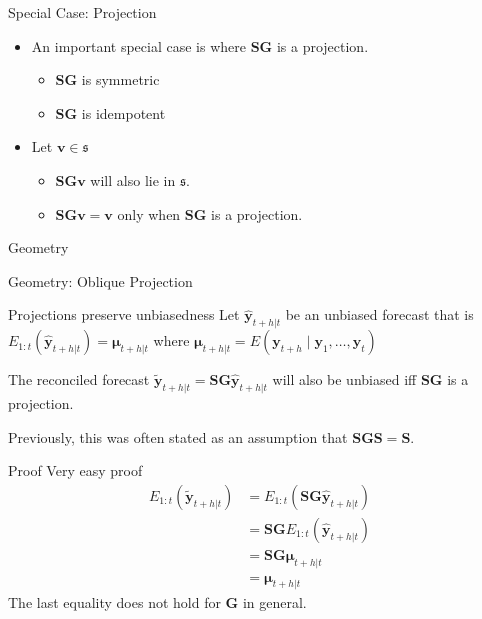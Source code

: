 \documentclass{beamer}
\begin{document}
  \begin{frame}{Special Case: Projection}
  \begin{itemize}
   \item An important special case is where ${\bm S}{\bm G}$ is a projection.
  \begin{itemize}
  	\item ${\bm S}{\bm G}$ is symmetric
  	\item ${\bm S}{\bm G}$ is idempotent
  \end{itemize}
  \item Let ${\bm v}\in\mathfrak{s}$ 
    \begin{itemize}
    	\item ${\bm S}{\bm G}{\bm v}$ will also lie in $\mathfrak{s}$.
    	\item ${\bm S}{\bm G}{\bm v}={\bm v}$ only when ${\bm S}{\bm G}$ is a projection.
    \end{itemize}
  \end{itemize}
  \end{frame}
  \begin{frame}{Geometry}
  	\vspace{-2.3cm}
  	\centering
  	
  \end{frame}
  \begin{frame}{Geometry: Oblique Projection}
  	\vspace{-0.9cm}
  	\centering
  	
  \end{frame}
  \begin{frame}{Projections preserve unbiasedness}
	Let $\hat{\bm y}_{t+h|t}$ be an unbiased forecast that is $E_{1:t}(\hat{\bm y}_{t+h|t})={\bm \mu_{t+h|t}}$ where ${\bm \mu_{t+h|t}}=E(\bm{y}_{t+h}\mid\bm{y}_{1},\dots,\bm{y}_{t})$
	\begin{theorem}
	  The reconciled forecast $\tilde{\bm y}_{t+h|t}={\bm S}{\bm G}\hat{\bm y}_{t+h|t}$ will also be unbiased iff ${\bm S}{\bm G}$ is a projection.
    \end{theorem}
    Previously, this was often stated as an assumption that ${\bm S}{\bm G}{\bm S}={\bm S}$.    
  \end{frame}
  \begin{frame}{Proof}
  Very easy proof
  \begin{align*}
  E_{1:t}(\tilde{\bm{y}}_{t+h|t})
  &= E_{1:t}(\bm{S}\bm{G}\hat{\bm{y}}_{t+h|t})\\
  &= \bm{S}\bm{G}E_{1:t}(\hat{\bm{y}}_{t+h|t})\\
  &= \bm{S}\bm{G}\bm{\mu}_{t+h|t}\\
  &= \bm{\mu}_{t+h|t}
  \end{align*}
  The last equality does not hold for ${\bm G}$ in general.
  \end{frame}
\end{document}
